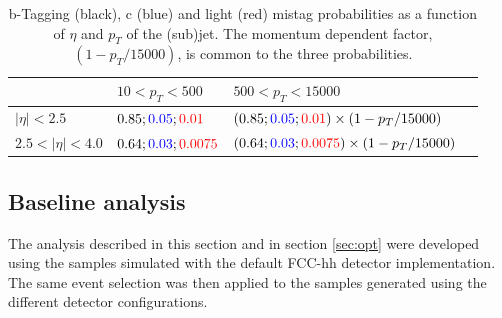 \begin{table}
	\centering
	\caption{b-Tagging (black), c (blue) and light (red) mistag probabilities as a function of $\eta$ and $p_T$ of the (sub)jet. The momentum dependent factor, $\left(1-p_T/15000\right)$, is common to the three probabilities.}
	\begin{tabular}{llll}
		\toprule 
		\backslashbox{$\eta$}{$p_T$} & $10<p_T<500$ & $500<p_T<15000$ &  \\
		\midrule
		$|\eta|<2.5$ & $0.85;\textcolor{blue}{0.05};\textcolor{red}{0.01} $ & $(0.85;\textcolor{blue}{0.05};\textcolor{red}{0.01})\times\left(1-p_T/15000\right)$ &   \\
		\rowcolor{black!7} $2.5<|\eta|<4.0$ & $0.64;\textcolor{blue}{0.03};\textcolor{red}{0.0075}$ & $(0.64;\textcolor{blue}{0.03};\textcolor{red}{0.0075})\times\left(1-p_T/15000\right)$ &  \\
		\bottomrule
	\end{tabular}
	\label{table:btag}
\end{table}

%
%
%

\subsection{Baseline analysis}

The analysis described in this section and in section \ref{sec:opt} were developed using the samples simulated with the default FCC-hh detector implementation. The same event selection was then applied to the samples generated using the different detector configurations. %

